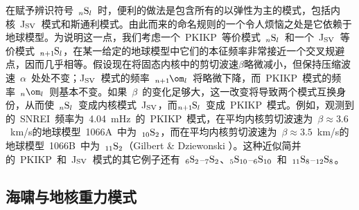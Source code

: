 {\enlargethispage{-0.5\baselineskip}
在赋予辨识符号~${}_n{\rm S}_l$~时，便利的做法是包含所有的以弹性为主的模式，包括内核~J${}_{\rm SV}$~模式和斯通利模式。由此而来的命名规则的一个令人烦恼之处是它依赖于地球模型。为说明这一点，我们考虑一个~PKIKP~等价模式~${}_n{\rm S}_l$~和一个~J${}_{\rm SV}$~等价模式~${}_{n+1\hspace{-0.01in}}{\rm S}_l$，在某一给定的地球模型中它们的本征频率非常接近一个交叉规避点，因而几乎相等。假设现在将固态内核中的剪切波速$\beta$略微减小，但保持压缩波速~$\alpha$~处处不变；J${}_{\rm SV}$~模式的频率~${}_{n+1\hspace{-0.01in}}\om_l$~将略微下降，而~PKIKP~模式的频率~${}_n\om_l$~则基本不变。如果~$\beta$~的变化足够大，这一改变将导致两个模式互换身份，从而使~${}_n{\rm S}_l$~变成内核模式~J${}_{\rm SV}$，而${}_{n+1\hspace{-0.01in}}{\rm S}_l$~变成~PKIKP~模式。例如，观测到的~SNREI~频率为~4.04~mHz~的~PKIKP~模式，在平均内核剪切波速为~$\beta\approx3.6$~km/s的地球模型~1066A~中为~${}_{10}{\rm S}_2$，而在平均内核剪切波速为~$\beta\approx3.5$~km/s的地球模型~1066B~中为~${}_{11}{\rm S}_2$（Gilbert \& Dziewonski \citeyear{gilbert&dziewonski75}）。这种近似简并的~PKIKP~和~J${}_{\rm SV}$~模式的其它例子还有~${}_6{\rm S}_2$--\hspace{0.2 mm}${}_7{\rm S}_2$、${}_5{\rm S}_{10}$--\hspace{0.2 mm}${}_6{\rm S}_{10}$~和~${}_{11}{\rm S}_8$--\hspace{0.2 mm}${}_{12}{\rm S}_8$。

\renewcommand{\thesubsection}{$\!\!\!\raise1.3ex\hbox{$\star$}\!\!$
\arabic{chapter}.\arabic{section}.\arabic{subsection}}
\subsection{海啸与地核重力模式}
%
%
%
%
%
%
%
\renewcommand{\thesubsection}{\arabic{chapter}.\arabic{section}.\arabic{subsection}}

}
